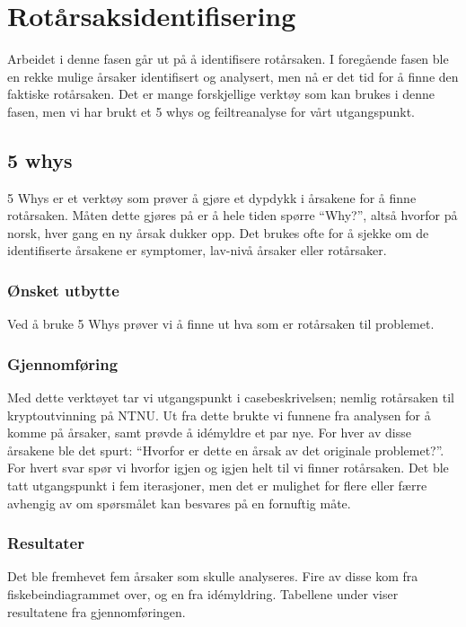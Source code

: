\chapter{Rotårsaksidentifisering}
Arbeidet i denne fasen går ut på å identifisere rotårsaken. I foregående fasen ble en rekke mulige årsaker identifisert og analysert, men nå er det tid for å finne den faktiske rotårsaken. Det er mange forskjellige verktøy som kan brukes i denne fasen, men vi har brukt et 5 whys og feiltreanalyse for vårt utgangspunkt. 

\section{5 whys}
5 Whys er et verktøy som prøver å gjøre et dypdykk i årsakene for å finne rotårsaken. Måten dette gjøres på er å hele tiden spørre ``Why?'', altså hvorfor på norsk, hver gang en ny årsak dukker opp. Det brukes ofte for å sjekke om de identifiserte årsakene er symptomer, lav-nivå årsaker eller rotårsaker. 

\subsection{Ønsket utbytte}
Ved å bruke 5 Whys prøver vi å finne ut hva som er rotårsaken til problemet.

\subsection{Gjennomføring}
Med dette verktøyet tar vi utgangspunkt i casebeskrivelsen; nemlig rotårsaken til kryptoutvinning på NTNU. Ut fra dette brukte vi funnene fra analysen for å komme på årsaker, samt prøvde å idémyldre et par nye. For hver av disse årsakene ble det spurt: ``Hvorfor er dette en årsak av det originale problemet?''. For hvert svar spør vi hvorfor igjen og igjen helt til vi finner rotårsaken. Det ble tatt utgangspunkt i fem iterasjoner, men det er mulighet for flere eller færre avhengig av om spørsmålet kan besvares på en fornuftig måte. 

\subsection{Resultater}
Det ble fremhevet fem årsaker som skulle analyseres. Fire av disse kom fra fiskebeindiagrammet over, og en fra idémyldring. Tabellene under viser resultatene fra gjennomføringen. 

